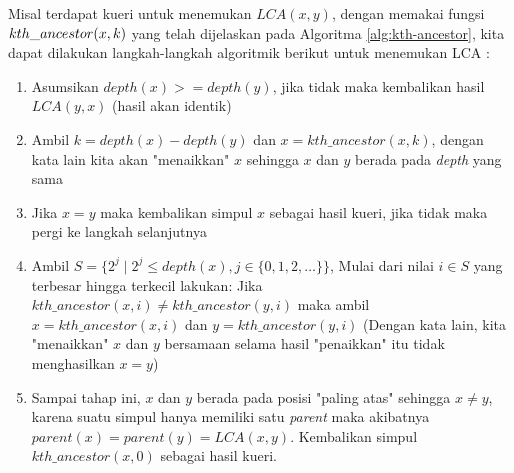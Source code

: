 \documentclass[12pt,a4paper]{article}
\begin{document}
Misal terdapat kueri untuk menemukan $LCA(x, y)$, 
dengan memakai fungsi $\linebreak kth\_ancestor(x, k)$ yang telah dijelaskan pada Algoritma \ref{alg:kth-ancestor}, 
kita dapat  dilakukan langkah-langkah algoritmik berikut untuk menemukan LCA \cite{cp-cses-book}:
\begin{enumerate}
    \item Asumsikan $depth(x) >= depth(y)$, jika tidak maka kembalikan hasil $LCA(y, x)$ (hasil akan identik)
    \item Ambil $k = depth(x) - depth(y)$ dan $x = kth\_ancestor(x, k)$, dengan kata lain kita akan "menaikkan" $x$ sehingga $x$ dan $y$ berada pada \textit{depth} yang sama
    \item Jika $x = y$ maka kembalikan simpul $x$ sebagai hasil kueri, jika tidak maka pergi ke langkah selanjutnya
    \item Ambil $S = \{ 2^j \mid 2^j \leq depth(x), j \in \{0, 1, 2, \dots \} \}$,
    Mulai dari nilai $i \in S$ yang terbesar hingga terkecil lakukan:
    Jika $kth\_ancestor(x, i) \neq kth\_ancestor(y, i)$ maka ambil $x = kth\_ancestor(x, i)$ dan $y = kth\_ancestor(y, i)$
    (Dengan kata lain, kita "menaikkan" $x$ dan $y$ bersamaan selama hasil "penaikkan" itu tidak menghasilkan $x = y$)
    \item Sampai tahap ini, $x$ dan $y$ berada pada posisi "paling atas" sehingga $x \neq y$, 
    karena suatu simpul hanya memiliki satu \textit{parent} maka akibatnya $parent(x) = parent(y) = LCA(x, y)$.
    Kembalikan simpul $kth\_ancestor(x, 0)$ sebagai hasil kueri.
\end{enumerate} \\
\end{document}
